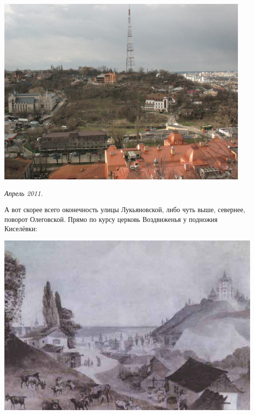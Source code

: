 \vspace*{\fill}
\begin{center}
\includegraphics[width=0.95\textwidth]{chast-colebanie-osnov/sheka/sheka-now.jpg}

\textit{Апрель 2011.}
\end{center}

\vspace*{\fill}




\newpage




А вот скорее всего оконечность улицы Лукьяновской, либо чуть выше, севернее, поворот Олеговской. Прямо по курсу церковь Воздвиженья у подножия Киселёвки:

\begin{center}
\includegraphics[width=\linewidth]{chast-colebanie-osnov/sheka/sheka-photo.jpg}
\end{center}

